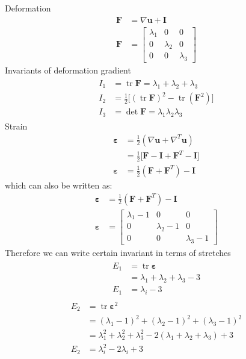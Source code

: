 \documentclass[12pt,3p]{article}
\numberwithin{equation}{section}
\begin{document}
Deformation 
\begin{align}
\mathbf{F} &= \nabla \mathbf{u} + \mathbf{I} \\
\mathbf{F} &= \begin{bmatrix}
			\lambda_1 & 0 & 0 \\
			0 & \lambda_2 & 0 \\
			0 & 0 & \lambda_3 
		\end{bmatrix}
\end{align}
Invariants of deformation gradient 
\begin{align}
\begin{split}
I_{1} &= \operatorname{tr} \mathbf{F} = \lambda_1 + \lambda_2 + \lambda_3 \\
I_{2} &= \frac{1}{2} \big[ ( \operatorname{tr} \mathbf{F} )^2 - \operatorname{tr} (\mathbf{F}^2) \big] \\
I_{3} &= \operatorname{det} \mathbf{F} = \lambda_1 \lambda_2 \lambda_3 
\end{split}
\end{align}
Strain 
\begin{align}
\boldsymbol{\varepsilon} &= \frac{1}{2} (\nabla \mathbf{u} + \nabla^T \mathbf{u}) \\
				      &= \frac{1}{2} \big[ \mathbf{F} - \mathbf{I} + \mathbf{F}^T - \mathbf{I} \big] \\
\boldsymbol{\varepsilon} &= \frac{1}{2} (\mathbf{F} + \mathbf{F}^T ) - \mathbf{I} 
\end{align}
which can also be written as: 
\begin{align}
\boldsymbol{\varepsilon} &= \frac{1}{2} (\mathbf{F} + \mathbf{F}^T ) - \mathbf{I} \\
\boldsymbol{\varepsilon} &= \begin{bmatrix}
				      	    \lambda_1 - 1& 0 & 0 \\
					    0 & \lambda_2 - 1& 0 \\
					    0 & 0 & \lambda_3 -1
				      	   \end{bmatrix}
\end{align}
Therefore we can write certain invariant in terms of stretches 
\begin{align}
\begin{split}
E_{1} &=\operatorname{tr} \boldsymbol{\varepsilon} \\
	 &= \lambda_1 + \lambda_2 + \lambda_3 -3 \\
E_{1} &= \lambda_i - 3
\end{split}
\end{align}
\begin{align}
\begin{split}
E_{2} &= \operatorname{tr} \boldsymbol{\varepsilon}^{2} \\
	 &= (\lambda_1 - 1)^2 + (\lambda_2 - 1)^2 + (\lambda_3 - 1)^2 \\
	 &= \lambda_1^2 + \lambda_2^2 + \lambda_3^2 - 2 (\lambda_1 + \lambda_2 + \lambda_3) + 3 \\
E_{2} &= \lambda_i^2 - 2 \lambda_i + 3
\end{split}
\end{align}
\end{document}
